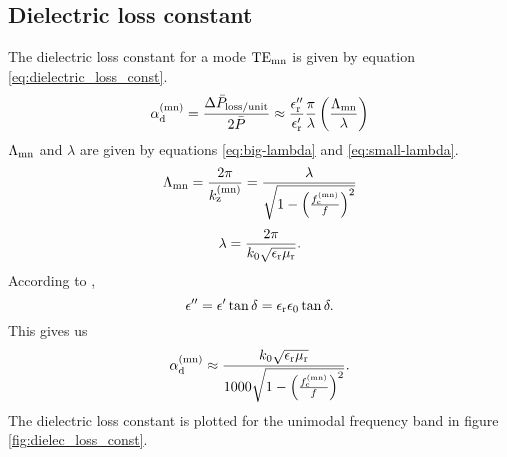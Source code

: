 \subsection{Dielectric loss constant}
The dielectric loss constant for a mode ${\rm TE}_{\rm mn}$ is given by equation \ref{eq:dielectric_loss_const}.
\begin{equation}
\alpha _{\rm d}^{\rm (mn)} = \frac{\Delta \bar P _{\rm loss/unit}}{2 \bar P} \approx \frac{\epsilon _{\rm r}''}{\epsilon _{\rm r}'} \frac{\pi}{\lambda} \left(\frac{\Lambda _{\rm mn}}{\lambda}\right)
\label{eq:dielectric_loss_const}
\end{equation}
$\Lambda _{\rm mn}$ and $\lambda$ are given by equations \ref{eq:big-lambda} and \ref{eq:small-lambda}.
\begin{equation}
\Lambda _{\rm mn} = \frac{2 \pi}{k_{\rm z}^{\rm (mn)}} = \frac{\lambda}{\sqrt{1 - \left(\frac{f_{\rm c}^{\rm (mn)}}{f}\right)^2}}
\label{eq:big-lambda}
\end{equation}
\begin{equation}
\lambda = \frac{2 \pi}{k_{\rm 0} \sqrt{\epsilon_{\rm r} \mu_{\rm r}}}.
\label{eq:small-lambda}
\end{equation}
According to \citep{pozar},
\begin{equation}
\epsilon'' = \epsilon' \tan \delta = \epsilon _{\rm r} \epsilon _{\rm 0} \tan \delta.
\end{equation}
This gives us 
\begin{equation}
\alpha _{\rm d}^{\rm (mn)} \approx \frac{k_{\rm 0} \sqrt{\epsilon_{\rm r} \mu_{\rm r}}}{1000 \sqrt{1 - \left(\frac{f_{\rm c}^{\rm (mn)}}{f}\right)^2}}.
\end{equation}
The dielectric loss constant is plotted for the unimodal frequency band in figure \ref{fig:dielec_loss_const}.
